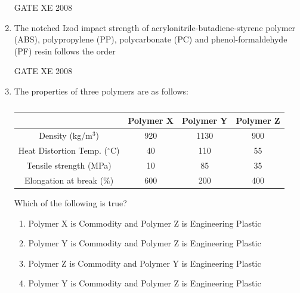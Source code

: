 \documentclass[12pt]{article}
\begin{document}
\begin{enumerate}
\begin{enumerate}
\end{enumerate}

GATE XE 2008

\item The notched Izod impact strength of acrylonitrile-butadiene-styrene polymer (ABS), polypropylene (PP), polycarbonate (PC) and phenol-formaldehyde (PF) resin follows the order

\begin{enumerate}
\end{enumerate}

GATE XE 2008

\item The properties of three polymers are as follows:

\begin{table}[H]     \centering     \caption{}     \label{}     \begin{tabular}{|c|c|c|c|}
\hline
 & \textbf{Polymer X} & \textbf{Polymer Y} & \textbf{Polymer Z} \\
\hline
Density (kg/m$^3$) & 920 & 1130 & 900 \\
Heat Distortion Temp. ($^\circ$C) & 40 & 110 & 55 \\
Tensile strength (MPa) & 10 & 85 & 35 \\
Elongation at break (\%) & 600 & 200 & 400 \\
\hline
\end{tabular} \end{table}

Which of the following is true? 

\begin{enumerate}
\item  Polymer X is Commodity and Polymer Z is Engineering Plastic 
\item  Polymer Y is Commodity and Polymer Z is Engineering Plastic 
\item  Polymer Z is Commodity and Polymer Y is Engineering Plastic 
\item  Polymer Y is Commodity and Polymer Z is Engineering Plastic 
\end{enumerate}


\end{enumerate}
\end{document}
